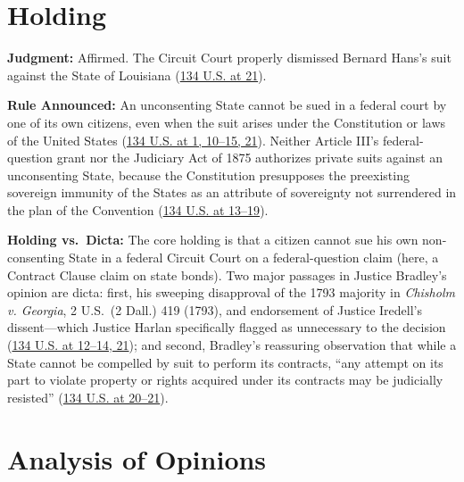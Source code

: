 \documentclass[12pt]{article}
\begin{document}
\section{Holding}
\textbf{Judgment:} Affirmed. The Circuit Court properly dismissed Bernard Hans's suit against the State of Louisiana (\href{https://supreme.justia.com/cases/federal/us/134/1/}{134 U.S. at 21}).

\textbf{Rule Announced:} An unconsenting State cannot be sued in a federal court by one of its own citizens, even when the suit arises under the Constitution or laws of the United States (\href{https://supreme.justia.com/cases/federal/us/134/1/}{134 U.S. at 1, 10--15, 21}). Neither Article III's federal-question grant nor the Judiciary Act of 1875 authorizes private suits against an unconsenting State, because the Constitution presupposes the preexisting sovereign immunity of the States as an attribute of sovereignty not surrendered in the plan of the Convention (\href{https://supreme.justia.com/cases/federal/us/134/1/}{134 U.S. at 13--19}).

\textbf{Holding vs.\ Dicta:} The core holding is that a citizen cannot sue his own non-consenting State in a federal Circuit Court on a federal-question claim (here, a Contract Clause claim on state bonds). Two major passages in Justice Bradley's opinion are dicta: first, his sweeping disapproval of the 1793 majority in \textit{Chisholm v. Georgia}, 2 U.S.\ (2 Dall.) 419 (1793), and endorsement of Justice Iredell's dissent---which Justice Harlan specifically flagged as unnecessary to the decision (\href{https://supreme.justia.com/cases/federal/us/134/1/}{134 U.S. at 12--14, 21}); and second, Bradley's reassuring observation that while a State cannot be compelled by suit to perform its contracts, ``any attempt on its part to violate property or rights acquired under its contracts may be judicially resisted'' (\href{https://supreme.justia.com/cases/federal/us/134/1/}{134 U.S. at 20--21}).

\section{Analysis of Opinions}
\end{document}
